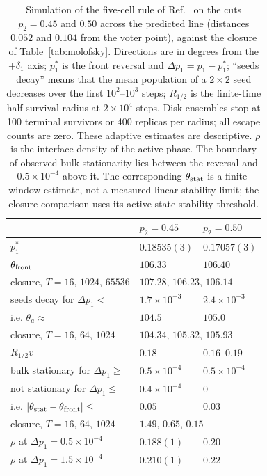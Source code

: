 \documentclass[pre,twocolumn,superscriptaddress,showpacs,floatfix]{revtex4-2}
\begin{document}
\begin{table}
\caption{Simulation of the five-cell rule of Ref.~\cite{molofsky1999} on the cuts $p_2 = 0.45$
and $0.50$ across the predicted line (distances $0.052$ and $0.104$ from the voter point),
against the closure of Table~\ref{tab:molofsky}. Directions are in degrees from the $+\delta_1$
axis; $p_1^*$ is the front reversal and $\Delta p_1 = p_1 - p_1^*$; ``seeds decay'' means that the mean population of a
$2\times2$ seed decreases over the first $10^2$--$10^3$ steps;
$R_{1/2}$ is the finite-time half-survival radius at $2\times10^4$ steps.
Disk ensembles stop at 100 terminal survivors or 400 replicas per radius;
all escape counts are zero. These adaptive estimates are descriptive.
$\rho$ is the interface density of the active phase. The boundary of observed bulk stationarity lies
between the reversal and $0.5\times10^{-4}$ above it. The corresponding
$\theta_{\rm stat}$ is a finite-window estimate, not a measured linear-stability
limit; the closure comparison uses its active-state stability threshold.}
\label{tab:molsim}
\begin{ruledtabular}
\begin{tabular}{lll}
 & $p_2 = 0.45$ & $p_2 = 0.50$ \\
\hline
$p_1^*$ & $0.18535(3)$ & $0.17057(3)$ \\
$\theta_{\rm front}$ & $106.33$ & $106.40$ \\
\quad closure, $T = 16$, $1024$, $65536$ & \multicolumn{2}{l}{$107.28$, $106.23$, $106.14$} \\
seeds decay for $\Delta p_1 <$ & $1.7\times10^{-3}$ & $2.4\times10^{-3}$ \\
\quad i.e. $\theta_a\approx$ & $104.5$ & $105.0$ \\
\quad closure, $T = 16$, $64$, $1024$ & \multicolumn{2}{l}{$104.34$, $105.32$, $105.93$} \\
$R_{1/2}v$ & $0.18$ & $0.16$--$0.19$ \\
bulk stationary for $\Delta p_1\ge$ & $0.5\times10^{-4}$ & $0.5\times10^{-4}$ \\
\quad not stationary for $\Delta p_1\le$ & $0.4\times10^{-4}$ & $0$ \\
\quad i.e. $|\theta_{\rm stat} - \theta_{\rm front}|\le$ & $0.05$ & $0.03$ \\
\quad closure, $T = 16$, $64$, $1024$ & \multicolumn{2}{l}{$1.49$, $0.65$, $0.15$} \\
$\rho$ at $\Delta p_1 = 0.5\times10^{-4}$ & $0.188(1)$ & $0.20$ \\
$\rho$ at $\Delta p_1 = 1.5\times10^{-4}$ & $0.210(1)$ & $0.22$ \\
\end{tabular}
\end{ruledtabular}
\end{table}
\end{document}
